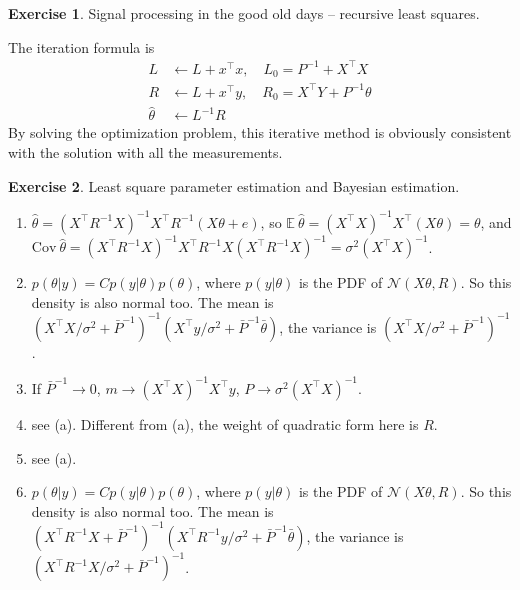 \documentclass[11pt,a4paper]{report}
\theoremstyle{definition}\newtheorem{exercise}{Exercise}[chapter]
\begin{document}
\begin{exercise}Signal processing in the good old days -- recursive least squares.\\
\end{exercise}
\begin{answer}
    The iteration formula is 
    \begin{align}
        L&\leftarrow L+x^\top x,\quad L_0=P^{-1}+X^\top X\\
        R&\leftarrow L+x^\top y,\quad R_0=X^\top Y +P^{-1}\theta\\
        \hat\theta &\leftarrow L^{-1}R
    \end{align}
    By solving the optimization problem, this iterative method is obviously consistent with the solution with all the measurements.
\end{answer}


\begin{exercise}Least square parameter estimation and Bayesian estimation.\\
\end{exercise}
\begin{answer}
\begin{enumerate}[label=(\alph*)]
    \item $\hat\theta=(X^\top R^{-1} X)^{-1}X^\top R^{-1}(X\theta+e)$, so $\mathbb{E}~\hat\theta=(X^\top X)^{-1}X^\top(X\theta)=\theta$, and $\text{Cov}~\hat\theta=(X^\top R^{-1} X)^{-1}X^\top R^{-1} X (X^\top R^{-1} X)^{-1}=\sigma^2 (X^\top X)^{-1}$.
    \item $p(\theta|y)=C p(y|\theta) p(\theta)$, where $p(y|\theta)$ is the PDF of $\mathcal{N}(X\theta,R)$. So this density is also normal too. The mean is $(X^\top X/\sigma^2 +\bar P^{-1})^{-1}(X^\top y/\sigma^2+\bar P^{-1}\bar\theta)$, the variance is $(X^\top X/\sigma^2 +\bar P^{-1})^{-1}$.
    \item If $\bar P^{-1}\rightarrow 0$, $m\rightarrow (X^\top X)^{-1}X^\top y$, $P\rightarrow \sigma^2 (X^\top X)^{-1}$.
    \item see (a). Different from (a), the weight of quadratic form here is $R$.
    \item see (a).
    \item $p(\theta|y)=C p(y|\theta) p(\theta)$, where $p(y|\theta)$ is the PDF of $\mathcal{N}(X\theta,R)$. So this density is also normal too. The mean is $(X^\top R^{-1} X +\bar P^{-1})^{-1}(X^\top R^{-1} y/\sigma^2+\bar P^{-1}\bar\theta)$, the variance is $(X^\top R^{-1} X/\sigma^2 +\bar P^{-1})^{-1}$.
\end{enumerate}
\end{answer}
\end{document}
